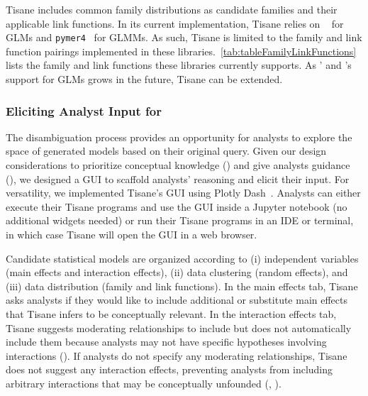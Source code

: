Tisane includes common family distributions as candidate families and their
applicable link functions. In its current implementation, Tisane relies on
\statsmodels~\cite{statsmodelsPaper} for GLMs and
\texttt{pymer4}~\cite{jolly2018pymer4} for GLMMs. As such, Tisane is limited to
the family and link function pairings implemented in these
libraries.~\autoref{tab:tableFamilyLinkFunctions} lists the family and link
functions these libraries currently supports. As \statsmodels' and \pymer's
support for GLMs grows in the future, Tisane can be extended.

\tableFamilyLinkFunctions

\subsubsection{Eliciting Analyst Input for \Disambiguation}\label{sec:disambiguation}
\groupExerciseDisambiguation
The disambiguation process provides an opportunity for analysts to explore the
space of generated models based on their original query. Given our design
considerations to prioritize conceptual knowledge (\dcConceptualKnowledge) and
give analysts guidance (\dcGuidance), we designed a GUI to scaffold analysts' reasoning and elicit their input.
For versatility, we implemented Tisane's GUI using Plotly
Dash~\cite{plotlyDash}. Analysts can either execute their Tisane programs and use the
GUI inside a Jupyter notebook (no additional widgets needed) or run
their Tisane programs in an IDE or terminal, in which case Tisane will open the
GUI in a web browser. 

Candidate statistical models are organized according to (i) independent
variables  (main effects and interaction effects), (ii) data clustering (random
effects), and (iii) data distribution (family and link functions). In the main
effects tab, Tisane asks analysts if they would like to include additional or
substitute main effects that Tisane infers to be conceptually relevant. In the
interaction effects tab, Tisane suggests moderating relationships to include but
does not automatically include them because analysts may not have specific
hypotheses involving interactions (\dcGuidance). If analysts do not specify any
moderating relationships, Tisane does not suggest any interaction effects,
preventing analysts from including arbitrary interactions that may be
conceptually unfounded (\dcConceptualKnowledge, \dcValidity).

